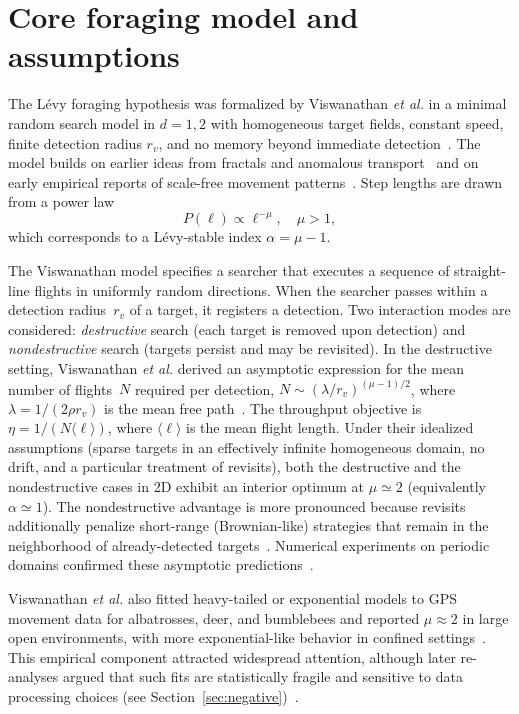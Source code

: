\section{Core foraging model and assumptions}
\label{sec:core_model}
The L\'evy foraging hypothesis was formalized by Viswanathan \emph{et al.} in a minimal random search model in $d=1,2$ with homogeneous target fields, constant speed, finite detection radius $r_v$, and no memory beyond immediate detection~\cite{viswanathan1999optimizing}. The model builds on earlier ideas from fractals and anomalous transport~\cite{mandelbrot1967coast,shlesinger1986walks,shlesinger1993strange} and on early empirical reports of scale-free movement patterns~\cite{cole1995fractal,focardi1996ungulates,heinrich1979resource,viswanathan1996albatross}. Step lengths are drawn from a power law
\[
P(\ell) \propto \ell^{-\mu},\quad \mu>1,
\]
which corresponds to a L\'evy-stable index $\alpha=\mu-1$.

The Viswanathan model specifies a searcher that executes a sequence of straight-line flights in uniformly random directions. When the searcher passes within a detection radius~$r_v$ of a target, it registers a detection. Two interaction modes are considered: \emph{destructive} search (each target is removed upon detection) and \emph{nondestructive} search (targets persist and may be revisited). In the destructive setting, Viswanathan \emph{et al.} derived an asymptotic expression for the mean number of flights~$N$ required per detection, $N \sim (\lambda/r_v)^{(\mu-1)/2}$, where $\lambda = 1/(2\rho r_v)$ is the mean free path~\cite{viswanathan1999optimizing}. The throughput objective is $\eta = 1/(N\langle\ell\rangle)$, where $\langle\ell\rangle$ is the mean flight length. Under their idealized assumptions (sparse targets in an effectively infinite homogeneous domain, no drift, and a particular treatment of revisits), both the destructive and the nondestructive cases in 2D exhibit an interior optimum at $\mu \simeq 2$ (equivalently $\alpha \simeq 1$). The nondestructive advantage is more pronounced because revisits additionally penalize short-range (Brownian-like) strategies that remain in the neighborhood of already-detected targets~\cite{viswanathan1999optimizing}. Numerical experiments on periodic domains confirmed these asymptotic predictions~\cite{viswanathan1999optimizing}.

Viswanathan \emph{et al.} also fitted heavy-tailed or exponential models to GPS movement data for albatrosses, deer, and bumblebees and reported $\mu \approx 2$ in large open environments, with more exponential-like behavior in confined settings~\cite{focardi1996ungulates,heinrich1979resource,viswanathan1996albatross,viswanathan1999optimizing}. This empirical component attracted widespread attention, although later re-analyses argued that such fits are statistically fragile and sensitive to data processing choices (see Section~\ref{sec:negative})~\cite{edwards2007revisiting,james2011assessing,plank2008optimal}.

